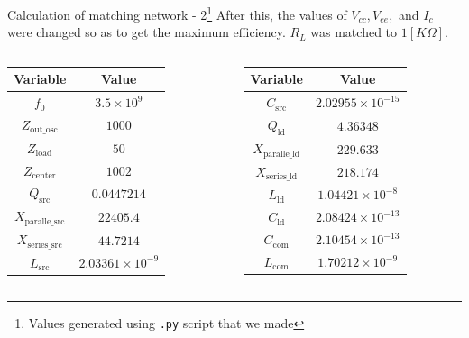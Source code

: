 \documentclass{beamer}
\begin{document}
\begin{frame}[fragile]{Calculation of matching network - 2\footnote{Values generated using \lstinline|.py| script that we made}}
After this, the values of \(V_{cc}, V_{ee}, \) and \(I_c\) were changed so as to get the maximum efficiency. \(R_L\) was matched to \(1[K\Omega]\).
\begin{columns}
  \begin{table}
    \centering
    \begin{tabular}{|c|c|}
        \hline
        \textbf{Variable} & \textbf{Value} \\
        \hline
        $f_0$ & $3.5 \times 10^9$ \\
        $Z_{\text{out\_osc}}$ & $1000$ \\
        $Z_{\text{load}}$ & $50$ \\
        $Z_{\text{center}}$ & $1002$ \\
        $Q_{\text{src}}$ & $0.0447214$ \\
        $X_{\text{paralle\_src}}$ & $22405.4$ \\
        $X_{\text{series\_src}}$ & $44.7214$ \\
        $L_{\text{src}}$ & $2.03361 \times 10^{-9}$ \\
        \hline
    \end{tabular}
  \end{table} 
  \begin{table}
    \centering
    \begin{tabular}{|c|c|}
        \hline
        \textbf{Variable} & \textbf{Value} \\
        \hline
        $C_{\text{src}}$ & $2.02955 \times 10^{-15}$ \\
        $Q_{\text{ld}}$ & $4.36348$ \\
        $X_{\text{paralle\_ld}}$ & $229.633$ \\
        $X_{\text{series\_ld}}$ & $218.174$ \\
        $L_{\text{ld}}$ & $1.04421 \times 10^{-8}$ \\
        $C_{\text{ld}}$ & $2.08424 \times 10^{-13}$ \\
        $C_{\text{com}}$ & $2.10454 \times 10^{-13}$ \\
        $L_{\text{com}}$ & $1.70212 \times 10^{-9}$ \\
        \hline
    \end{tabular}
  \end{table} 
\end{columns}

\end{frame}
\end{document}
